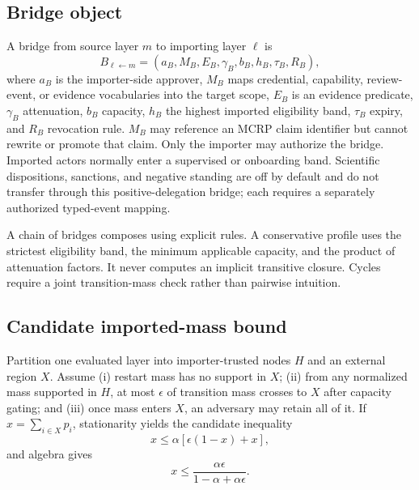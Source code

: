 \documentclass[11pt]{article}
\begin{document}
\subsection{Bridge object}

A bridge from source layer $m$ to importing layer $\ell$ is
\begin{equation}
 B_{\ell\leftarrow m}=(a_B,M_B,E_B,\gamma_B,b_B,h_B,\tau_B,R_B),
\end{equation}
where $a_B$ is the importer-side approver, $M_B$ maps credential, capability, review-event, or evidence vocabularies into the target scope, $E_B$ is an evidence predicate, $\gamma_B$ attenuation, $b_B$ capacity, $h_B$ the highest imported eligibility band, $\tau_B$ expiry, and $R_B$ revocation rule. $M_B$ may reference an MCRP claim identifier but cannot rewrite or promote that claim. Only the importer may authorize the bridge. Imported actors normally enter a supervised or onboarding band. Scientific dispositions, sanctions, and negative standing are off by default and do not transfer through this positive-delegation bridge; each requires a separately authorized typed-event mapping.

A chain of bridges composes using explicit rules.  A conservative profile uses the strictest eligibility band, the minimum applicable capacity, and the product of attenuation factors.  It never computes an implicit transitive closure.  Cycles require a joint transition-mass check rather than pairwise intuition.

\subsection{Candidate imported-mass bound}

Partition one evaluated layer into importer-trusted nodes $H$ and an external region $X$.  Assume (i) restart mass has no support in $X$; (ii) from any normalized mass supported in $H$, at most $\epsilon$ of transition mass crosses to $X$ after capacity gating; and (iii) once mass enters $X$, an adversary may retain all of it.  If $x=\sum_{i\in X}p_i$, stationarity yields the candidate inequality
\begin{equation}
 x\leq \alpha\left[\epsilon(1-x)+x\right],
\end{equation}
and algebra gives
\begin{equation}
 x\leq \frac{\alpha\epsilon}{1-\alpha+\alpha\epsilon}.
 \label{eq:bridgebound}
\end{equation}
\end{document}
